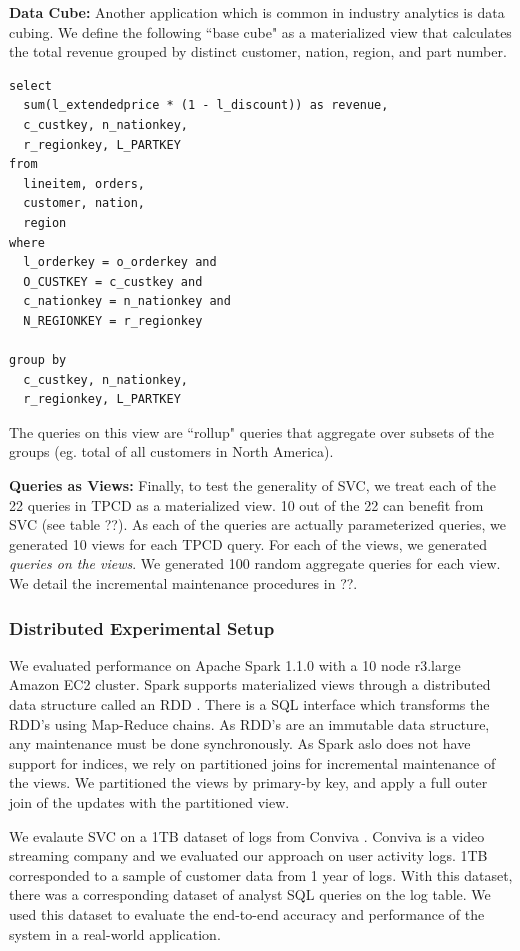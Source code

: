 \textbf{Data Cube: } Another application which is common in industry analytics is data cubing.
We define the following ``base cube" as a materialized view that calculates the total revenue 
grouped by distinct customer, nation, region, and part number.
\begin{lstlisting}
select
  sum(l_extendedprice * (1 - l_discount)) as revenue,
  c_custkey, n_nationkey,
  r_regionkey, L_PARTKEY
from
  lineitem, orders,
  customer, nation,
  region
where
  l_orderkey = o_orderkey and
  O_CUSTKEY = c_custkey and
  c_nationkey = n_nationkey and
  N_REGIONKEY = r_regionkey

group by
  c_custkey, n_nationkey, 
  r_regionkey, L_PARTKEY
\end{lstlisting}
The queries on this view are ``rollup" queries that aggregate over 
subsets of the groups (eg. total of all customers in North America).

\textbf{Queries as Views: } Finally, to test the generality of SVC, we treat each of the 22 queries in TPCD as a materialized view.
10 out of the 22 can benefit from SVC (see table ??).
As each of the queries are actually parameterized queries, we generated 10 views for each TPCD query.
For each of the views, we generated \emph{queries on the views}.
We generated 100 random aggregate queries for each view.
We detail the incremental maintenance procedures in ??.

\subsubsection{Distributed Experimental Setup}
We evaluated performance on Apache Spark 1.1.0 with a 10 node r3.large Amazon EC2 cluster.
Spark supports materialized views through a distributed data structure called an RDD \cite{zaharia2012resilient}.
There is a SQL interface which transforms the RDD's using Map-Reduce chains.
As RDD's are an immutable data structure, any maintenance must be done synchronously.
As Spark aslo does not have support for indices, we rely on partitioned joins for incremental maintenance of the views.
We partitioned the views by primary-by key, and apply a full outer join of the updates with the partitioned view.

We evalaute SVC on a 1TB dataset of logs from Conviva \cite{conviva}.
Conviva is a video streaming company and we evaluated our approach on user activity logs.
1TB corresponded to a sample of customer data from 1 year of logs.
With this dataset, there was a corresponding dataset of analyst SQL queries on the log table.
We used this dataset to evaluate the end-to-end accuracy and performance of the system in a real-world application.

